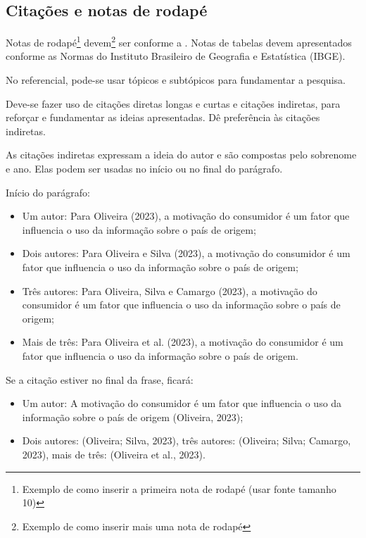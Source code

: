 \documentclass[
	article,             %
	12pt,                %
	oneside,             %
	a4paper,             %
	english,             %
	brazil,              %
	sumario=tradicional
]{abntex2}
\begin{document}
\subsection{Citações e notas de rodapé}

Notas de rodapé\footnote{Exemplo de como inserir a primeira nota de rodapé (usar fonte tamanho 10)} devem\footnote{Exemplo de como inserir mais uma nota de rodapé} ser conforme a . Notas de tabelas devem apresentados conforme as Normas do Instituto Brasileiro de Geografia e Estatística (IBGE).

No referencial, pode-se usar tópicos e subtópicos para fundamentar a pesquisa.

Deve-se fazer uso de citações diretas longas e curtas e citações indiretas, para reforçar e fundamentar as ideias apresentadas. Dê preferência às citações indiretas. 

As citações indiretas expressam a ideia do autor e são compostas pelo sobrenome e ano. Elas podem ser usadas no início ou no final do parágrafo.

Início do parágrafo:

\begin{itemize}
    \item Um autor: Para Oliveira (2023), a motivação do consumidor é um fator que influencia o uso da informação sobre o país de origem;
    \item Dois autores: Para Oliveira e Silva (2023), a motivação do consumidor é um fator que influencia o uso da informação sobre o país de origem;
    \item Três autores: Para Oliveira, Silva e Camargo (2023), a motivação do consumidor é um fator que influencia o uso da informação sobre o país de origem;
    \item Mais de três: Para Oliveira et al. (2023), a motivação do consumidor é um fator que influencia o uso da informação sobre o país de origem.
\end{itemize}

Se a citação estiver no final da frase, ficará:

\begin{itemize}
    \item Um autor: A motivação do consumidor é um fator que influencia o uso da informação sobre o país de origem (Oliveira, 2023);
    \item Dois autores: (Oliveira; Silva, 2023), três autores: (Oliveira; Silva; Camargo, 2023), mais de três: (Oliveira et al., 2023).
\end{itemize}
\end{document}
